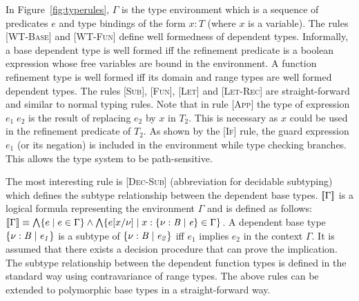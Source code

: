 %
In Figure~\ref{fig:typerules}, $\Gamma$ is the type environment which is a sequence of
predicates $e$ and type bindings of the form $x:T$ (where $x$ is a variable). 
The rules \textsc{[WT-Base]} and \textsc{[WT-Fun]} define well formedness of dependent types. Informally, a base dependent type is well formed iff the refinement predicate is a boolean expression whose free variables are bound in the environment. A function refinement type is well formed iff its domain and range types are well formed dependent types. The rules \textsc{[Sub]}, \textsc{[Fun]}, \textsc{[Let]} and \textsc{[Let-Rec]} are straight-forward and similar to normal typing rules.
Note that in rule \textsc{[App]} the type of expression $e_1 \; e_2$ is the result 
of replacing $e_2$ by $x$ in $T_2$. This is necessary as $x$ could be used in the refinement predicate of $T_2$. As shown 
by the \textsc{[If]} rule, the guard expression $e_1$ (or its negation) is included in the environment while type checking branches. This allows the type system to be path-sensitive. 

The most interesting rule is \textsc{[Dec-Sub]} (abbreviation for decidable subtyping) which defines the subtype relationship between the dependent base types. $[\![\Gamma]\!]$ is a logical formula representing the environment $\Gamma$ and is defined as follows:
$[\![\Gamma]\!] \equiv \bigwedge \{ e \; | \; e \in \Gamma \} \wedge \bigwedge \{ e[x/\nu] \; | \; x:\mathit{\{ \nu:B \; | \; e\}} \in \Gamma \}$. 
A dependent base type $\mathit{\{ \nu:B \; | \; e_1\}}$ is a subtype of $\mathit{\{ \nu:B \; | \; e_2\}}$ iff 
$e_1$ implies $e_2$ in the context $\Gamma$. 
It is assumed that there exists a decision procedure that can prove the implication.
The subtype relationship between the dependent function types is defined in the standard way using contravariance of range types.
The above rules can be extended to polymorphic base types in a straight-forward way.

